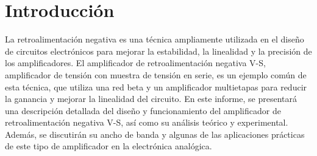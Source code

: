 \documentclass[12pt, letterpaper]{article}
\begin{document}
\newpage
\tableofcontents
\newpage

\section{Introducción}

La retroalimentación negativa es una técnica ampliamente utilizada en el diseño de circuitos electrónicos para mejorar la estabilidad, la linealidad y la precisión de los amplificadores.
El amplificador de retroalimentación negativa V-S, amplificador de tensión con muestra de tensión en serie, es un ejemplo común de esta técnica, que utiliza una red beta y un amplificador multietapas para reducir la ganancia y mejorar la linealidad del circuito.
En este informe, se presentará una descripción detallada del diseño y funcionamiento del amplificador de retroalimentación negativa V-S, así como su análisis teórico y experimental.
Además, se discutirán su ancho de banda y algunas de las aplicaciones prácticas de este tipo de amplificador en la electrónica analógica.
\end{document}
